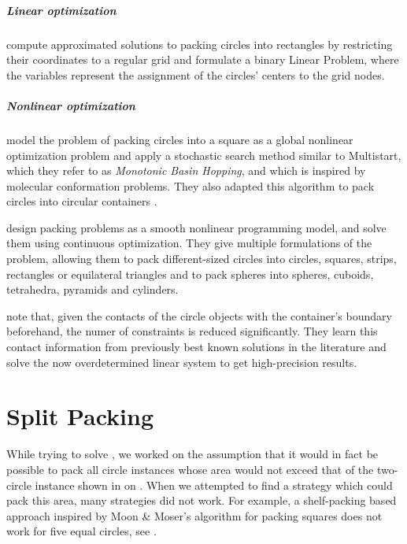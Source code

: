 \documentclass[a4paper,style=print,oneside,bibliography=totoc,nexus,lnum,extramargin]{tubsbook}
\begin{document}
\paragraph{Linear optimization}

\textcite{LIE2014approximate} compute approximated solutions to packing circles into rectangles by restricting their coordinates to a regular grid and formulate a binary Linear Problem, where the variables represent the assignment of the circles' centers to the grid nodes.


\paragraph{Nonlinear optimization}

\textcite{ALS2008disk} model the problem of packing circles into a square as a global nonlinear optimization problem and apply a stochastic search method similar to Multistart, which they refer to as \emph{Monotonic Basin Hopping}, and which is inspired by molecular conformation problems. They also adapted this algorithm to pack circles into circular containers \cite{GJLS2009solving}.

\textcite{BS2008minimizing} design packing problems as a smooth nonlinear programming model, and solve them using continuous optimization. They give multiple formulations of the problem, allowing them to pack different-sized circles into circles, squares, strips, rectangles or equilateral triangles and to pack spheres into spheres, cuboids, tetrahedra, pyramids and cylinders.

\textcite{BG2010new} note that, given the contacts of the circle objects with the container's boundary beforehand, the numer of constraints is reduced significantly. They learn this contact information from previously best known solutions in the literature and solve the now overdetermined linear system to get high-precision results.

\chapter{Split Packing}\label{ch:split-packing}

While trying to solve , we worked on the assumption that it would in fact be possible to pack all circle instances whose area would not exceed that of the two-circle instance shown in  on .%
When we attempted to find a strategy which could pack this area, many strategies did not work. For example, a shelf-packing based approach inspired by Moon \& Moser's algorithm for packing squares does not work for five equal circles, see .
\end{document}
